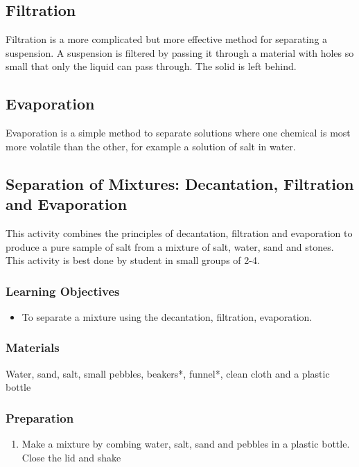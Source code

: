 \subsection{Filtration}

Filtration is a more complicated but more effective method for separating a suspension. A suspension is filtered by passing it through a material with holes so small that only the liquid can pass through. The solid is left behind.

\subsection{Evaporation}

Evaporation is a simple method to separate solutions where one chemical is most more volatile than the other, for example a solution of salt in water.

\subsection{Separation of Mixtures: Decantation, Filtration and Evaporation}
This activity combines the principles of decantation, filtration and evaporation to produce a pure sample of salt from a mixture of salt, water, sand and stones. This activity is best done by student in small groups of 2-4.

\subsubsection*{Learning Objectives}
\begin{itemize}
\item{To separate  a mixture using the decantation, filtration, evaporation.}
\end{itemize}

\subsubsection*{Materials}
Water, sand, salt, small pebbles, beakers*, funnel*, clean cloth and a plastic bottle
\subsubsection*{Preparation}
\begin{enumerate}
\item{Make a mixture by combing water, salt, sand and pebbles in a plastic bottle. Close the lid and shake}
\end{enumerate}
